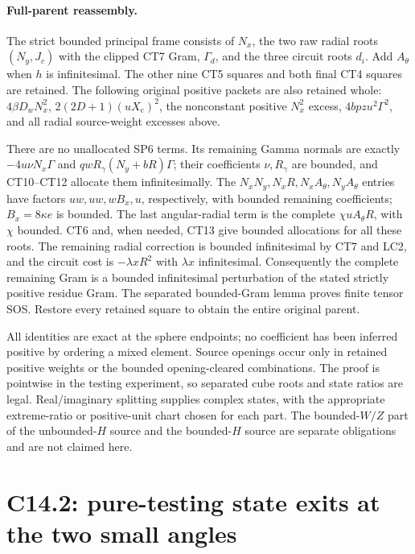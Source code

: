 \paragraph{Full-parent reassembly.}
The strict bounded principal frame consists of $N_x$, the two raw
radial roots $(N_y,J_c)$ with the clipped CT7 Gram, $\Gamma_d$,
and the three circuit roots $d_i$.  Add $A_\theta$ when $h$ is
infinitesimal.  The other nine CT5 squares and both final CT4
squares are retained.  The following original positive packets
are also retained whole: $4\beta D_wN_x^2$,
$2(2D+1)(uX_e)^2$, the nonconstant positive $N_x^2$ excess,
$4bpzu^2\Gamma^2$, and all radial source-weight excesses above.

There are no unallocated SP6 terms.  Its remaining Gamma normals
are exactly $-4u\nu N_x\Gamma$ and
$qwR_\gamma(N_y+bR)\Gamma$; their coefficients $\nu,R_\gamma$
are bounded, and CT10--CT12 allocate them infinitesimally.
The $N_xN_y,N_xR,N_xA_\theta,N_yA_\theta$ entries have factors
$uw,uw,wB_x,u$, respectively, with bounded remaining coefficients;
$B_x=8\kappa e$ is bounded.  The last angular-radial term is the
complete $\chi uA_\theta R$, with $\chi$ bounded.  CT6 and,
when needed, CT13 give bounded allocations for all these roots.
The remaining radial correction is bounded infinitesimal by CT7
and LC2, and the circuit cost is $-\lambda xR^2$ with
$\lambda x$ infinitesimal.  Consequently the complete remaining
Gram is a bounded infinitesimal perturbation of the stated strictly
positive residue Gram.  The separated bounded-Gram lemma proves
finite tensor SOS.  Restore every retained square to obtain the
entire original parent.

All identities are exact at the sphere endpoints; no coefficient
has been inferred positive by ordering a mixed element.  Source
openings occur only in retained positive weights or the bounded
opening-cleared combinations.  The proof is pointwise in the
testing experiment, so separated cube roots and state ratios are
legal.  Real/imaginary splitting supplies complex states, with the
appropriate extreme-ratio or positive-unit chart chosen for each part.
The bounded-$W/Z$ part of the unbounded-$H$ source and the
bounded-$H$ source are separate obligations and are not claimed here.


\section{\texorpdfstring{C14.2: pure-testing state exits at the two small angles}{C14.2: pure-testing state exits at the two small angles}}
\label{component:p8655d641d4a7}

